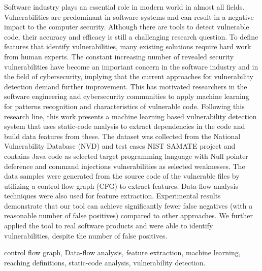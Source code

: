 \abstractEN %

Software industry plays an essential role in modern world in almost all fields. Vulnerabilities are predominant in software systems and can result in a negative impact to the computer security. Although there are tools to detect vulnerable code, their accuracy and efficacy is still a challenging research question. To define features that identify vulnerabilities, many existing solutions require hard work from human experts. The constant increasing number of revealed security vulnerabilities have become an important concern in the software industry and in the field of cybersecurity, implying that the current approaches for vulnerability detection demand further improvement. This has motivated researchers in the software engineering and cybersecurity communities to apply machine learning for patterns recognition and characteristics of vulnerable code. Following this research line, this work presents a machine learning based vulnerability detection system that uses static-code analysis to extract dependencies in the code and build data features from these. The dataset was collected from the National Vulnerability Database (NVD) and test cases NIST SAMATE project and contains Java code as selected target programming language with Null pointer deference and command injections vulnerabilities as selected weaknesses. The data samples were generated from the source code of the vulnerable files by utilizing a control flow graph (CFG) to extract features. Data-flow analysis techniques were also used for feature extraction. Experimental results demonstrate that our tool can achieve significantly fewer false negatives (with a reasonable number of false positives) compared to other approaches. We further applied the tool to real software products and were able to identify vulnerabilities, despite the number of false positives.

\begin{keywords}
control flow graph, Data-flow analysis, feature extraction, machine learning, reaching definitions, static-code analysis, vulnerability detection.
\end{keywords} 
